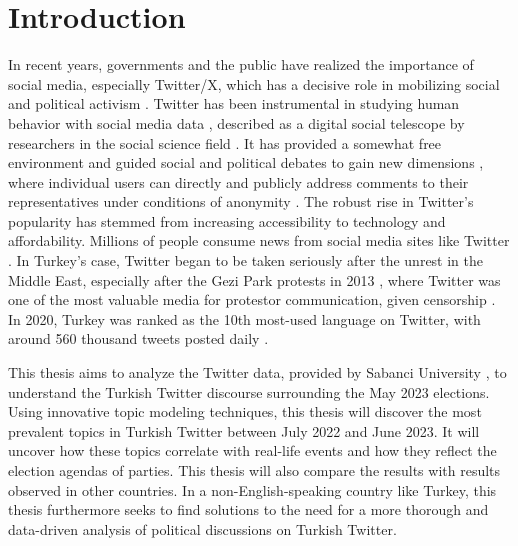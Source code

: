 
\chapter{Introduction}\label{chapter:introduction}

In recent years, governments and the public have realized the importance of social media, 
especially Twitter/X, which has a decisive role in mobilizing social and political activism 
\parencite{uysal_turkeys_twitter_public_diplomacy_2019}. 
Twitter has been instrumental in studying human behavior with social media data 
\parencite{pfeffer_twitter_24_Hours_just_another_day_2023}, 
described as a digital social telescope by researchers in the social science field 
\parencite{mejova_twitter_2015_social_telescope}. 
It has provided a somewhat free environment and guided social and political debates to 
gain new dimensions \parencite{yerlikaya_social_media_manipulation_politics_2020}, 
where individual users can directly and publicly address comments to their representatives under 
conditions of anonymity \parencite{theocharis_twitter_political_incivility_2020}. The robust rise 
in Twitter's popularity has stemmed from increasing accessibility to technology and affordability. 
Millions of people consume news from social media sites like Twitter \parencite{anwar_analyzing_twitter_BERT_QAnon_2021}. 
In Turkey's case, Twitter began to be taken seriously after the unrest in the Middle East, 
especially after the Gezi Park protests in 2013 \parencite{zaharna_uysal_social_media_2016}, 
where Twitter was one of the most valuable media for protestor communication, given censorship 
\parencite{ogan__varol_twitter_gezi_park_2017}.
In 2020, Turkey was ranked as the 10th most-used language on Twitter, with around 560 thousand 
tweets posted daily \parencite{alshaabi_social_media_twitter_analysis_2021}. 


This thesis aims to analyze the Twitter data, provided by Sabanci University \parencite{secim2023},
to understand the Turkish Twitter discourse surrounding the May 2023 elections. Using innovative
topic modeling techniques, this thesis will discover the most prevalent topics in Turkish Twitter
between July 2022 and June 2023. It will uncover how these topics correlate with real-life events
and how they reflect the election agendas of parties. This thesis will also compare the results with 
results observed in other countries. In a non-English-speaking country like Turkey, this thesis 
furthermore seeks to find solutions to the need for a more thorough and data-driven 
analysis of political discussions on Turkish Twitter. 


